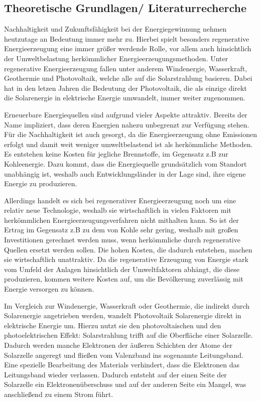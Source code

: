 \subsection {Theoretische Grundlagen/ Literaturrecherche} 
	\par Nachhaltigkeit und Zukunftsfähigkeit bei der Energiegewinnung nehmen heutzutage an Bedeutung immer mehr zu. Hierbei spielt besonders regenerative Energieerzeugung eine immer größer werdende Rolle, vor allem auch hinsichtlich der Umweltbelastung herkömmlicher Energieerzeugungsmethoden. Unter regenerative Energieerzeugung fallen unter anderem Windenergie, Wasserkraft, Geothermie und Photovoltaik, welche alle auf die Solarstrahlung basieren. Dabei hat in den letzen Jahren die Bedeutung der Photovoltaik, die als einzige direkt die Solarenergie in elektrische Energie umwandelt, immer weiter zugenommen.
	\par Erneuerbare Energiequellen sind aufgrund vieler Aspekte attraktiv. Bereits der Name impliziert, dass deren Energien nahezu unbegrenzt zur Verfügung stehen. Für die Nachhaltigkeit ist auch gesorgt, da die Energieerzeugung ohne Emissionen erfolgt und damit weit weniger umweltbelastend ist als herkömmliche Methoden. Es entstehen keine Kosten für jegliche Brennstoffe, im Gegensatz z.B zur Kohleenergie. Dazu kommt, dass die Energiequelle grundsätzlich vom Standort unabhängig ist, weshalb auch Entwicklungsländer in der Lage sind, ihre eigene Energie zu produzieren.
	\par Allerdings handelt es sich bei regenerativer Energieerzeugung noch um eine relativ neue Technologie, weshalb sie wirtschaftlich in vielen Faktoren mit herkömmlichen Energieerzeugungsverfahren nicht mithalten kann. So ist der Ertrag im Gegensatz z.B zu dem von Kohle sehr gering, weshalb mit großen Investitionen gerechnet werden muss, wenn herkömmliche durch regenerative Quellen ersetzt werden sollen. Die hohen Kosten, die dadurch entstehen, machen sie wirtschaftlich unattraktiv. Da die regenerative Erzeugung von Energie stark vom Umfeld der Anlagen hinsichtlich der Umweltfaktoren abhängt, die diese produzieren, kommen weitere Kosten auf, um die Bevölkerung zuverlässig mit Energie versorgen zu können.
	\par Im Vergleich zur Windenergie, Wasserkraft oder Geothermie, die indirekt durch Solarenergie angetrieben werden, wandelt Photovoltaik Solarenergie direkt in elektrische Energie um. Hierzu nutzt sie den photovoltaischen und den photoelektrischen Effekt: Solarstrahlung trifft auf die Oberfläche einer Solarzelle. Dadurch werden manche Elektronen der äußeren Schichten der Atome der Solarzelle angeregt und fließen vom Valenzband ins sogenannte Leitungsband. Eine spezielle Bearbeitung des Materials verhindert, dass die Elektronen das Leitungsband wieder verlassen. Dadurch entsteht auf der einen Seite der Solarzelle ein Elektronenüberschuss und auf der anderen Seite ein Mangel, was anschließend zu einem Strom führt.
